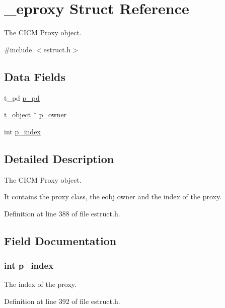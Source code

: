 \hypertarget{struct__eproxy}{\section{\-\_\-eproxy Struct Reference}
\label{struct__eproxy}
}


The C\-I\-C\-M Proxy object.  




{\ttfamily \#include $<$estruct.\-h$>$}

\subsection*{Data Fields}
\begin{DoxyCompactItemize}
\item 
t\-\_\-pd \hyperlink{struct__eproxy_a818a512bafab5b368d1fa0bca9872451}{p\-\_\-pd}
\item 
\hyperlink{struct__text}{t\-\_\-object} $\ast$ \hyperlink{struct__eproxy_aafbddf848d70a14ab336be2b19cc535f}{p\-\_\-owner}
\item 
int \hyperlink{struct__eproxy_adf4f65c8db21f49ab60d62fedcfa9192}{p\-\_\-index}
\end{DoxyCompactItemize}


\subsection{Detailed Description}
The C\-I\-C\-M Proxy object. 

It contains the proxy class, the eobj owner and the index of the proxy. 

Definition at line 388 of file estruct.\-h.



\subsection{Field Documentation}
\hypertarget{struct__eproxy_adf4f65c8db21f49ab60d62fedcfa9192}{
\subsubsection[{p\-\_\-index}]{\setlength{\rightskip}{0pt plus 5cm}int p\-\_\-index}}\label{struct__eproxy_adf4f65c8db21f49ab60d62fedcfa9192}
The index of the proxy. 

Definition at line 392 of file estruct.\-h.

